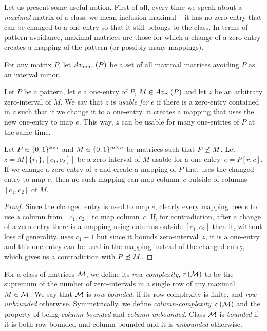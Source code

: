Let us present some useful notion. First of all, every time we speak about a \emph{maximal} matrix of a class, we mean inclusion maximal -- it has no zero-entry that can be changed to a one-entry so that it still belongs to the class. In terms of pattern avoidance, maximal matrices are those for which a change of a zero-entry creates a mapping of the pattern (or possibly many mappings).

\begin{defn}
For any matrix $P$, let $Av_{max}\left(P\right)$ be a set of all maximal matrices avoiding $P$ as an interval minor.
\end{defn}

\begin{defn}
Let $P$ be a pattern, let $e$ a one-entry of $P$, $M\in Av_{\preceq}\left(P\right)$ and let $z$ be an arbitrary zero-interval of $M$. We say that $z$ is \emph{usable for} $e$ if there is a zero-entry contained in $z$ such that if we change it to a one-entry, it creates a mapping that uses the new one-entry to map $e$. This way, $z$ can be usable for many one-entries of $P$ at the same time. 
\end{defn}

\begin{obs}
Let $P\in\{0,1\}^{k\times l}$ and $M\in\{0,1\}^{m\times n}$ be matrices such that $P\not\preceq M$. Let $z=M[\{r_1\},[c_1,c_2]]$ be a zero-interval of $M$ usable for a one-entry~$e=P[r,c]$. If we change a zero-entry of $z$ and create a mapping of $P$ that uses the changed entry to map $e$, then no such mapping can map column~$c$ outside of columns $[c_1,c_2]$ of $M$. 
\end{obs}
\begin{proof}
Since the changed entry is used to map $e$, clearly every mapping needs to use a column from $[c_1,c_2]$ to map column~$c$. If, for contradiction, after a change of a zero-entry there is a mapping using columns outside $[c_1,c_2]$ then it, without loss of generality. uses $c_1-1$ but since it bounds zero-interval~$z$, it is a one-entry and this one-entry can be used in the mapping instead of the changed entry, which gives us a contradiction with $P\not\preceq M$.
\end{proof}

\begin{defn}
For a class of matrices $\mathcal{M}$, we define its \emph{row-complexity}, $r\left(\mathcal{M}\right)$ to be the supremum of the number of zero-intervals in a single row of any maximal $M\in\mathcal{M}$. We say that $\mathcal{M}$ is \emph{row-bounded}, if its row-complexity is finite, and \emph{row-unbounded} otherwise. Symmetrically, we define \emph{column-complexity}~$c\left(\mathcal{M}\right)$ and the property of being \emph{column-bounded} and \emph{column-unbounded}. Class $\mathcal{M}$ is \emph{bounded} if it is both row-bounded and column-bounded and it is \emph{unbounded} otherwise.
\end{defn}

